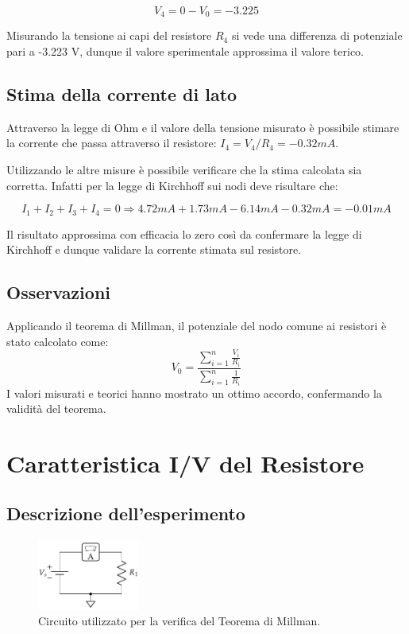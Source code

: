 \documentclass[a4paper,6pt]{article}
\begin{document}
\[
    V_4 = 0-V_0 =-3.225
\]


Misurando la tensione ai capi del resistore \(R_4\) si vede una differenza di potenziale pari a -3.223 V, dunque il valore sperimentale approssima il valore terico.


\subsection{Stima della corrente di lato}

Attraverso la legge di Ohm e il valore della tensione misurato è possibile stimare la corrente che passa attraverso il resistore: \(I_4 = V_4 / R_4 = -0.32 mA\).

Utilizzando le altre misure è possibile verificare che la stima calcolata sia corretta.
Infatti per la legge di Kirchhoff sui nodi deve risultare che:

\[
I_1 + I_2 + I_3 + I_4 = 0 \Rightarrow 4.72 mA + 1.73 mA -6.14 mA-0.32 mA = -0.01 mA
\]

Il risultato approssima con efficacia lo zero così da confermare la legge di Kirchhoff e dunque validare la corrente stimata sul resistore.

\subsection{Osservazioni}
Applicando il teorema di Millman, il potenziale del nodo comune ai resistori è stato calcolato come:
\[
V_0 = \frac{\sum_{i=1}^{n} \frac{V_i}{R_i}}{\sum_{i=1}^{n} \frac{1}{R_i}}
\]
I valori misurati e teorici hanno mostrato un ottimo accordo, confermando la validità del teorema.



\section{Caratteristica I/V del Resistore}

\subsection{Descrizione dell'esperimento}

\begin{figure}[!ht]
    \centering
    \includegraphics[width=0.3\textwidth]{assets/3.png}
    \caption{Circuito utilizzato per la verifica del Teorema di Millman.}
    \label{fig:Circuito: caratteristica I/V del resistore.}
\end{figure}
\end{document}
